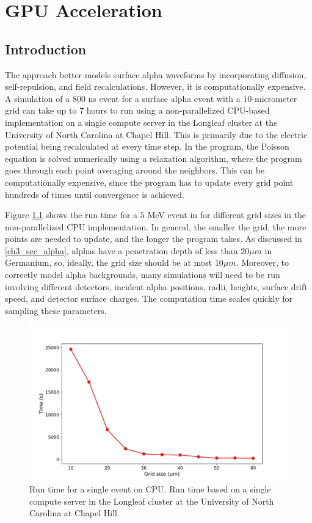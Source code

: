 \chapter{GPU Acceleration}
\label{chap4:gpu}

\section{Introduction}
The {\ehd} approach better models surface alpha waveforms by incorporating diffusion, self-repulsion, and field recalculations. However, it is computationally expensive. A simulation of a $800$ ns event for a surface alpha event with a $10$-micrometer grid can take up to $7$ hours to run using a non-parallelized CPU-based implementation on a single compute server in the Longleaf cluster at the University of North Carolina at Chapel Hill. This is primarily due to the electric potential being recalculated at every time step. In the program, the Poisson equation is solved numerically using a relaxation algorithm, where the program goes through each point averaging around the neighbors. This can be computationally expensive, since the program has to update every grid point hundreds of times until convergence is achieved. 

Figure \ref{fig:CPU_time} shows the run time for a $5$ MeV event in {\ehd} for different grid sizes in the non-parallelized CPU implementation. In general, the smaller the grid, the more points are needed to update, and the longer the program takes. As discussed in \ref{ch3_sec_alpha}, alphas have a penetration depth of less than $20 \mu m$ in Germanium, so, ideally, the grid size should be at most $10 \mu m$. Moreover, to correctly model alpha backgrounds, many simulations will need to be run involving different detectors, incident alpha positions, radii, heights, surface drift speed, and detector surface charges. The computation time scales quickly for sampling these parameters.

\begin{figure}
\centering
 \includegraphics[width=0.99\linewidth]{ch4/figs/cpu_run_time.pdf}
\caption{Run time for a single {\ehd} event on CPU. Run time based on a single compute server in the Longleaf cluster at the University of North Carolina at Chapel Hill.}
\label{fig:CPU_time}
\end{figure}


